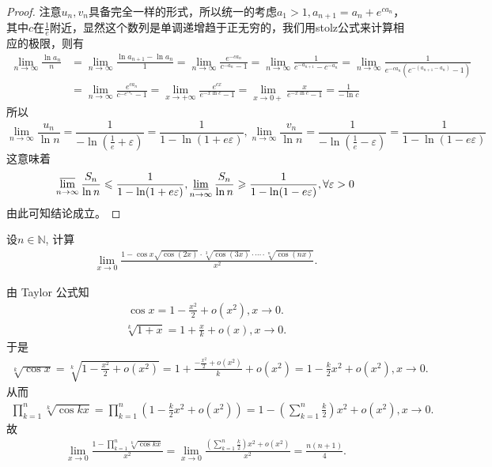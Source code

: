\documentclass[../../main.tex]{subfiles}%
\begin{document}
\begin{proof}
注意\(u_n,v_n\)具备完全一样的形式，所以统一的考虑\(a_1>1,a_{n + 1}=a_n + e^{ca_n}\)，其中\(c\)在\(\frac{1}{e}\)附近，显然这个数列是单调递增趋于正无穷的，我们用stolz公式来计算相应的极限，则有
\begin{align*}
\lim_{n\rightarrow\infty}\frac{\ln a_n}{n}&=\lim_{n\rightarrow\infty}\frac{\ln a_{n + 1}-\ln a_n}{1}=\lim_{n\rightarrow\infty}\frac{e^{-ca_n}}{c^{-a_n}-1}=\lim_{n\rightarrow\infty}\frac{1}{c^{-a_{n + 1}}-c^{-a_n}}=\lim_{n\rightarrow\infty}\frac{1}{e^{-ca_n}(c^{-(a_{n + 1}-a_n)}-1)}\\
&=\lim_{n\rightarrow\infty}\frac{e^{ca_n}}{c^{-e^{ca_n}}-1}=\lim_{x\rightarrow+\infty}\frac{e^{cx}}{e^{-x\ln c}-1}=\lim_{x\rightarrow0+}\frac{x}{e^{-x\ln c}-1}=\frac{1}{-\ln c}
\end{align*}
所以
\[\lim_{n\rightarrow\infty}\frac{u_n}{\ln n}=\frac{1}{-\ln(\frac{1}{e}+\varepsilon)}=\frac{1}{1-\ln(1 + e\varepsilon)},\lim_{n\rightarrow\infty}\frac{v_n}{\ln n}=\frac{1}{-\ln(\frac{1}{e}-\varepsilon)}=\frac{1}{1-\ln(1 - e\varepsilon)}\]
这意味着
\[\varlimsup_{n\rightarrow\infty}\frac{S_n}{\ln n}\leqslant \frac{1}{1-\ln(1 + e\varepsilon)},\varliminf_{n\rightarrow\infty}\frac{S_n}{\ln n}\geqslant \frac{1}{1-\ln(1 - e\varepsilon)},\forall\varepsilon>0\]
由此可知结论成立。
\end{proof}

\begin{example}
设$n \in \mathbb{N}$, 计算
\begin{align*}
\lim_{x \to 0} \frac{1 - \cos x \sqrt{\cos (2x)} \cdot \sqrt[3]{\cos (3x)} \cdot \cdots \cdot \sqrt[n]{\cos (nx)}}{x^2}.
\end{align*}
\end{example}
\begin{solution}
由 Taylor 公式知
\begin{align*}
\cos x = 1 - \frac{x^2}{2} + o(x^2), x \to 0.
\end{align*}
\begin{align*}
\sqrt[k]{1 + x} = 1 + \frac{x}{k} + o(x), x \to 0.
\end{align*}
于是
\begin{align*}
\sqrt[k]{\cos x} = \sqrt[k]{1 - \frac{x^2}{2} + o(x^2)} = 1 + \frac{-\frac{x^2}{2} + o(x^2)}{k} + o(x^2) = 1 - \frac{k}{2}x^2 + o(x^2), x \to 0.
\end{align*}
从而
\begin{align*}
\prod_{k=1}^n \sqrt[k]{\cos kx} = \prod_{k=1}^n \left( 1 - \frac{k}{2}x^2 + o(x^2) \right) = 1 - \left( \sum_{k=1}^n \frac{k}{2} \right) x^2 + o(x^2), x \to 0.
\end{align*}
故
\begin{align*}
\lim_{x \to 0} \frac{1 - \prod\limits_{k=1}^n \sqrt[k]{\cos kx}}{x^2} = \lim_{x \to 0} \frac{\left( \sum\limits_{k=1}^n \frac{k}{2} \right) x^2 + o(x^2)}{x^2} = \frac{n(n + 1)}{4}.
\end{align*}

\end{solution}
\end{document}

